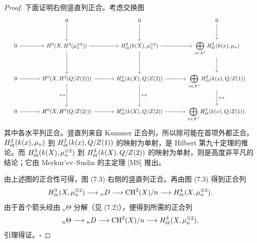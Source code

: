 \begin{proof}
下面证明右侧竖直列正合。考虑交换图
\[
\resizebox{.98\linewidth}{!}{$
\begin{tikzcd}[ampersand replacement=\&,column sep=large,row sep=large]
 \&0\arrow[d]\&0\arrow[d]\&0\arrow[d]\\
 0\arrow[r]\&H^0(X,\mathcal H^3(\mu_n^{\otimes2}))\arrow[r]\arrow[d]
 \&H^3_{\et}(k(X),\mu_n^{\otimes2})\arrow[r]\arrow[d]
 \&\displaystyle\bigoplus_{x\in X^1}H^2_{\et}(k(x),\mu_n)\arrow[d]\\
 0\arrow[r]\&H^0(X,\mathcal H^3(\mathbb Q/\mathbb Z(2)))\arrow[r]\arrow[d,"{\times n}"']
 \&H^3_{\et}(k(X),\mathbb Q/\mathbb Z(2))\arrow[r]\arrow[d,"{\times n}"]
 \&\displaystyle\bigoplus_{x\in X^1}H^2_{\et}(k(x),\mathbb Q/\mathbb Z(1))\arrow[d,"{\times n}"]\\
 0\arrow[r]\&H^0(X,\mathcal H^3(\mathbb Q/\mathbb Z(2)))\arrow[r]
 \&H^3_{\et}(k(X),\mathbb Q/\mathbb Z(2))\arrow[r]
 \&\displaystyle\bigoplus_{x\in X^1}H^2_{\et}(k(x),\mathbb Q/\mathbb Z(1)).
\end{tikzcd}$}
\]
其中各水平列正合。竖直列来自 Kummer 正合列，所以除可能在首项外都正合。$H^2_{\mathrm{\acute et}}(k(x),\mu_n)$ 到 $H^2_{\mathrm{\acute et}}(k(x),Q/Z(1))$ 的映射为单射，是 Hilbert 第九十定理的推论。而 $H^3_{\mathrm{\acute et}}(k(X),\mu_n^{\otimes2})$ 到 $H^3_{\mathrm{\acute et}}(k(X),Q/Z(2))$ 的映射为单射，则是高度非平凡的结论；它由 Merkur'ev--Suslin 的主定理 [MS] 推出。

由上述图的正合性可得，图 (7.3) 右侧的竖直列正合。再由图 (7.3) 得到正合列
\[
 H^3_{\mathrm{\acute et}}(X,\mu_n^{\otimes2})\longrightarrow{}_nD
 \longrightarrow\operatorname{CH}^2(X)/n\longrightarrow H^4_{\mathrm{\acute et}}(X,\mu_n^{\otimes2}).
\]
由于首个箭头经由 ${}_n\Theta$ 分解（见 (7.2)），便得到所需的正合列
\[
 {}_n\Theta\longrightarrow{}_nD\longrightarrow\operatorname{CH}^2(X)/n
 \longrightarrow H^4_{\mathrm{\acute et}}(X,\mu_n^{\otimes2}).
\]
引理得证。\hfill$\square$


\end{proof}
